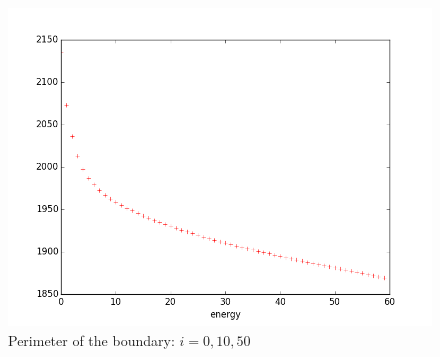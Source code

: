 \documentclass{beamer}
\begin{document}
\begin{frame}[allowframebreaks]
\begin{figure}
        \includegraphics[scale=0.15]{img/perimeter-dense}
        \caption*{Perimeter of the boundary: $ i = 0, 10, 50 $}
    \end{figure}


\end{frame}
\end{document}
